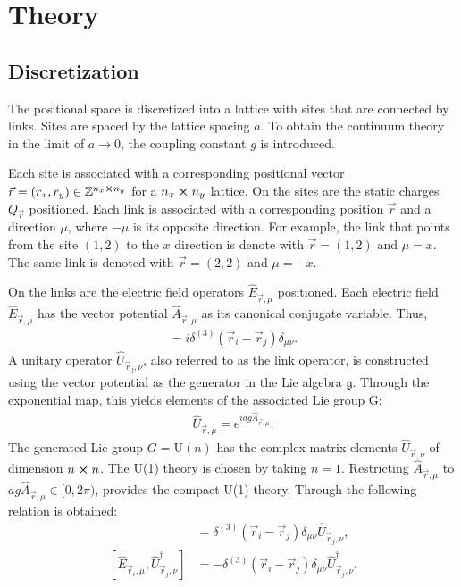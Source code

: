 \section{Theory}
\subsection{Discretization}

The positional space is discretized into a lattice with sites that are connected by links. Sites are spaced by the lattice spacing $a$. To obtain the continuum theory in the limit of $a\rightarrow 0$, the coupling constant $g$ is introduced.\cite{RevModPhys.51.659}

Each site is associated with a corresponding positional vector $\vec{r}=(r_x, r_y)\in \mathbb{Z}^{n_{x} \cross n_{y}}$ for a $n_{x} \cross n_{y}$ lattice. On the sites are the static charges $Q_{\vec{r}}$ positioned. Each link is associated with a corresponding position $\vec{r}$ and a direction $\mu$, where $-\mu$ is its opposite direction. For example, the link that points from the site $(1, 2)$ to the $x$ direction is denote with $\vec{r}=(1, 2)$ and $\mu=x$. The same link is denoted with $\vec{r}=(2, 2)$ and $\mu=-x$.

On the links are the electric field operators $\hat{E}_{\vec{r},\mu}$ positioned. Each electric field $\hat{E}_{\vec{r}, \mu}$ has the vector potential $\hat{A}_{\vec{r}, \mu}$ as its canonical conjugate variable. Thus,
\begin{align}
  [\hat{E}_{\vec{r}_{i}, \mu}, \hat{A}_{\vec{r}_{j}, \nu}]=i\delta^{(3)}(\vec{r}_{i}-\vec{r}_{j})\delta_{\mu\nu}.\label{eq:com}
\end{align}
A unitary operator $\hat{U}_{\vec{r}_{j}, \nu}$, also referred to as the link operator, is constructed using the vector potential as the generator in the Lie algebra $\mathfrak{g}$. Through the exponential map, this yields elements of the associated Lie group G:
\begin{align}
	\hat{U}_{\vec{r}, \mu} = e^{iag\hat{A}_{\vec{r}, \mu}}.\label{eq:exp}
\end{align}
The generated Lie group $G=\text{U}(n)$ has the complex matrix elements $\hat{U}_{\vec{r}, \nu}$ of dimension $n\cross n$. The U(1) theory is chosen by taking $n=1$. Restricting $\hat{A}_{\vec{r}, \mu}$ to $ag\hat{A}_{\vec{r}, \mu}\in[0, 2\pi)$, provides the compact U(1) theory. Through  the following relation is obtained: 
\begin{align}
  [\hat{E}_{\vec{r}_{i}, \mu}, \hat{U}_{\vec{r}_{j}, \nu}]      & =\delta^{(3)}(\vec{r}_{i}-\vec{r}_{j})\delta_{\mu\nu}\hat{U}_{\vec{r}_{j}, \nu},\label{eq:comu1}       \\
  [\hat{E}_{\vec{r}_{i}, \mu}, \hat{U}_{\vec{r}_{j}, \nu}^\dag] & =-\delta^{(3)}(\vec{r}_{i}-\vec{r}_{j})\delta_{\mu\nu}\hat{U}_{\vec{r}_{j}, \nu}^{\dag}. \label{eq:comu2}
\end{align}

